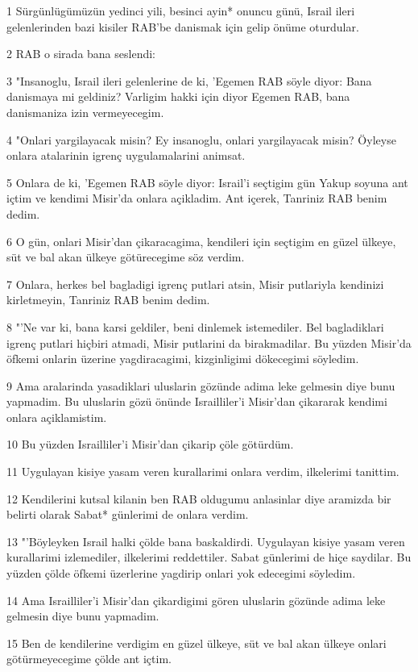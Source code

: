 \par 1 Sürgünlügümüzün yedinci yili, besinci ayin* onuncu günü, Israil ileri gelenlerinden bazi kisiler RAB'be danismak için gelip önüme oturdular.
\par 2 RAB o sirada bana seslendi:
\par 3 "Insanoglu, Israil ileri gelenlerine de ki, 'Egemen RAB söyle diyor: Bana danismaya mi geldiniz? Varligim hakki için diyor Egemen RAB, bana danismaniza izin vermeyecegim.
\par 4 "Onlari yargilayacak misin? Ey insanoglu, onlari yargilayacak misin? Öyleyse onlara atalarinin igrenç uygulamalarini animsat.
\par 5 Onlara de ki, 'Egemen RAB söyle diyor: Israil'i seçtigim gün Yakup soyuna ant içtim ve kendimi Misir'da onlara açikladim. Ant içerek, Tanriniz RAB benim dedim.
\par 6 O gün, onlari Misir'dan çikaracagima, kendileri için seçtigim en güzel ülkeye, süt ve bal akan ülkeye götürecegime söz verdim.
\par 7 Onlara, herkes bel bagladigi igrenç putlari atsin, Misir putlariyla kendinizi kirletmeyin, Tanriniz RAB benim dedim.
\par 8 "'Ne var ki, bana karsi geldiler, beni dinlemek istemediler. Bel bagladiklari igrenç putlari hiçbiri atmadi, Misir putlarini da birakmadilar. Bu yüzden Misir'da öfkemi onlarin üzerine yagdiracagimi, kizginligimi dökecegimi söyledim.
\par 9 Ama aralarinda yasadiklari uluslarin gözünde adima leke gelmesin diye bunu yapmadim. Bu uluslarin gözü önünde Israilliler'i Misir'dan çikararak kendimi onlara açiklamistim.
\par 10 Bu yüzden Israilliler'i Misir'dan çikarip çöle götürdüm.
\par 11 Uygulayan kisiye yasam veren kurallarimi onlara verdim, ilkelerimi tanittim.
\par 12 Kendilerini kutsal kilanin ben RAB oldugumu anlasinlar diye aramizda bir belirti olarak Sabat* günlerimi de onlara verdim.
\par 13 "'Böyleyken Israil halki çölde bana baskaldirdi. Uygulayan kisiye yasam veren kurallarimi izlemediler, ilkelerimi reddettiler. Sabat günlerimi de hiçe saydilar. Bu yüzden çölde öfkemi üzerlerine yagdirip onlari yok edecegimi söyledim.
\par 14 Ama Israilliler'i Misir'dan çikardigimi gören uluslarin gözünde adima leke gelmesin diye bunu yapmadim.
\par 15 Ben de kendilerine verdigim en güzel ülkeye, süt ve bal akan ülkeye onlari götürmeyecegime çölde ant içtim.
